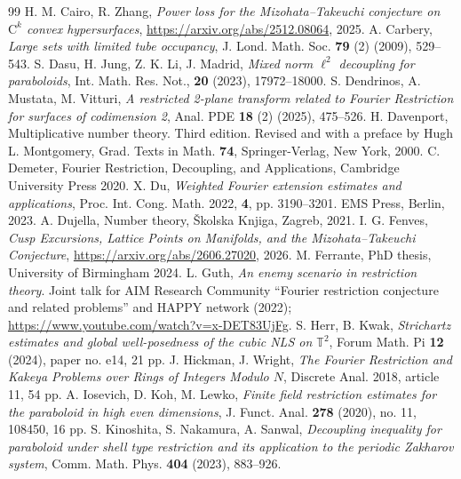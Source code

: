 \documentclass[10pt,a4paper]{amsart}
\numberwithin{equation}{section}
\begin{document}
\begin{thebibliography}{99}
 H. M. Cairo, R. Zhang, \textit{Power loss for the Mizohata--Takeuchi conjecture on $\mathrm{C}^k$ convex hypersurfaces}, \url{https://arxiv.org/abs/2512.08064}, 2025.
 A. Carbery, \textit{Large sets with limited tube occupancy}, J. Lond. Math. Soc. \textbf{79} (2) (2009), 529--543.
 S. Dasu, H. Jung, Z. K. Li, J. Madrid, \textit{Mixed norm $\ell^2$ decoupling for paraboloids}, Int. Math. Res. Not., \textbf{20} (2023), 17972--18000.
 S. Dendrinos, A. Mustata, M. Vitturi, \textit{A restricted 2-plane transform related to Fourier Restriction for surfaces of codimension 2}, Anal. PDE \textbf{18} (2) (2025), 475--526.
 H. Davenport, Multiplicative number theory. Third edition. Revised and with a preface by Hugh L. Montgomery, Grad. Texts in Math. \textbf{74}, Springer-Verlag, New York, 2000.
 C. Demeter, Fourier Restriction, Decoupling, and Applications, Cambridge University Press 2020.
 X. Du, \textit{Weighted Fourier extension estimates and applications}, Proc. Int. Cong. Math. 2022, \textbf{4}, pp. 3190--3201. EMS Press, Berlin, 2023.
 A. Dujella, Number theory, \v{S}kolska Knjiga, Zagreb, 2021.
 I. G. Fenves, \textit{Cusp Excursions, Lattice Points on Manifolds, and the Mizohata--Takeuchi Conjecture}, \url{https://arxiv.org/abs/2606.27020}, 2026.
 M. Ferrante, PhD thesis, University of Birmingham 2024.
 L. Guth, \textit{An enemy scenario in restriction theory}. Joint talk for AIM Research Community ``Fourier restriction conjecture and related problems'' and HAPPY network (2022); \url{https://www.youtube.com/watch?v=x-DET83UjFg}.
 S. Herr, B. Kwak, \textit{Strichartz estimates and global well-posedness of the cubic NLS on $\mathbb{T}^{2}$}, Forum Math. Pi \textbf{12} (2024), paper no. e14, 21 pp.
 J. Hickman, J. Wright, \textit{The Fourier Restriction and Kakeya Problems over Rings of Integers Modulo $N$}, Discrete Anal. 2018, article 11, 54 pp.
 A. Iosevich, D. Koh, M. Lewko, \textit{Finite field restriction estimates for the paraboloid in high even dimensions}, J. Funct. Anal. \textbf{278} (2020), no. 11, 108450, 16 pp.
 S. Kinoshita, S. Nakamura, A. Sanwal, \textit{Decoupling inequality for paraboloid under shell type restriction and its application to the periodic Zakharov system}, Comm. Math. Phys. \textbf{404} (2023), 883--926.

\end{thebibliography}
\end{document}
